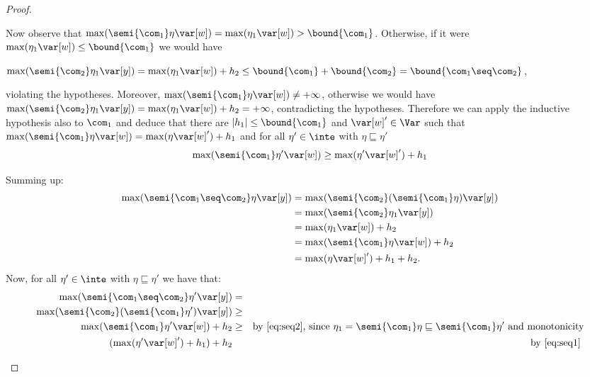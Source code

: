 \begin{proof}
\begin{inductive}
    Now observe that
    \(\max(\semi{\com_1}\eta \var[w]) = \max(\eta_1 \var[w]) >
    \bound{\com_1}\). Otherwise, if it were \(\max(\eta_1 \var[w]) \leq
    \bound{\com_1}\) we would have
    \begin{center}
      \(\max(\semi{\com_2}\eta_1 \var[y]) = \max(\eta_1 \var[w]) + h_2 \leq
      \bound{\com_1} + \bound{\com_2} = \bound{\com_1 \seq \com_2}\),
    \end{center}
    violating the hypotheses. Moreover,
    \(\max(\semi{\com_1}\eta \var[w]) \neq +\infty\), otherwise we
    would have
    \({\max(\semi{\com_2} \eta_1 \var[y])} = {\max(\eta_1 \var[w]) +
      h_2} = + \infty\), contradicting the hypotheses.  Therefore we
    can apply the inductive hypothesis also to \(\com_1\) and deduce
    that there are \(|h_1| \leq \bound{\com_1}\) and
    \(\var[w]' \in \Var\) such that
    \(\max(\semi{\com_1} \eta \var[w]) = \max(\eta \var[w]') + h_1\)
    and for all \(\eta' \in \inte\) with \(\eta \sqsubseteq \eta'\)
    \begin{equation}
      \label{eq:seq1}
      \max(\semi{\com_1} \eta' \var[w]) \geq \max(\eta' \var[w]') + h_1
    \end{equation}

    Summing up:
    \begin{align*}
      \max(\semi{\com_1 \seq \com_2}\eta \var[y])
      &= \max(\semi{\com_2}(\semi{\com_1}\eta) \var[y])\\
      & = \max(\semi{\com_2}\eta_1 \var[y])\\
      & = \max(\eta_1 \var[w]) + h_2\\
      & = \max(\semi{\com_1}\eta \var[w]) + h_2\\
      & = \max(\eta \var[w]')+h_1 + h_2.
    \end{align*}
    Now, for all \(\eta' \in \inte\) with \(\eta \sqsubseteq \eta'\) we have that:
    \begin{align*}
      \max(\semi{\com_1 \seq \com_2}\eta' \var[y]) & = & \\ 
      \max(\semi{\com_2}(\semi{\com_1}\eta') \var[y]) & \geq & \\ 
      \max(\semi{\com_1}\eta' \var[w]) + h_2 & \geq & 
                                                      \text{by\ \eqref{eq:seq2}, since } \eta_1 = \semi{\com_1}\eta \sqsubseteq \semi{\com_1}\eta' \text{ and monotonicity} \\
      (\max(\eta' \var[w]') +h_1) + h_2 & & \text{by\ \eqref{eq:seq1}}\
    \end{align*}


\end{inductive}
\end{proof}
